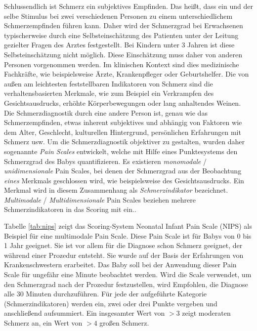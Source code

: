 Schlussendlich ist Schmerz ein subjektives Empfinden. Das heißt, dass ein und der selbe Stimulus bei zwei verschiedenen Personen zu einem unterschiedlichem Schmerzempfinden führen kann. Daher wird der Schmerzgrad bei Erwachsenen typischerweise durch eine Selbsteinschätzung des Patienten unter der Leitung gezielter Fragen des Arztes festgestellt. Bei Kindern unter 3 Jahren ist diese Selbsteinschätzung nicht möglich. Diese Einschätzung muss daher von anderen Personen vorgenommen werden. Im klinischen Kontext sind dies medizinische Fachkräfte, wie beispielsweise Ärzte, Krankenpfleger oder Geburtshelfer. Die von außen am leichtesten feststellbaren Indikatoren von Schmerz sind die verhaltensbasierten Merkmale, wie zum Beispiel ein Verkrampfen des Gesichtsausdrucks, erhöhte Körperbewegungen oder lang anhaltendes Weinen.\cite[S. 438]{PainAssessment01} Die Schmerzdiagnostik durch eine andere Person ist, genau wie das Schmerzempfinden, etwas inherent subjektives und abhängig von Faktoren wie dem Alter, Geschlecht, kulturellen Hintergrund, persönlichen Erfahrungen mit Schmerz usw.\cite[S. 3]{overview} Um die Schmerzdiagnostik objektiver zu gestalten, wurden daher sogenannte \emph{Pain Scales} entwickelt, welche mit Hilfe eines Punktesystems den Schmerzgrad des Babys quantifizieren.\cite[S. 438 - 439]{PainAssessment01} Es existieren \emph{monomodale} / \emph{unidimensionale} Pain Scales, bei denen der Schmerzgrad aus der Beobachtung \emph{eines} Merkmals geschlossen wird, wie beispielsweise des Gesichtsausdrucks. Ein Merkmal wird in diesem Zusammenhang als \emph{Schmerzindikator} bezeichnet. \emph{ Multimodale} / \emph{Multidimensionale} Pain Scales beziehen mehrere Schmerzindikatoren in das Scoring mit ein.\cite[S. 69 - 71]{PainAssessment02}. 

Tabelle \ref{tab:nips} zeigt das Scoring-System \glqq Neonatal Infant Pain Scale\grqq{} (NIPS) als Beispiel für eine multimodale Pain Scale. Diese Pain Scale ist für Babys von 0 bis 1 Jahr geeignet. Sie ist vor allem für die Diagnose schon Schmerz geeignet, der während einer Prozedur entsteht. Sie wurde auf der Basis der Erfahrungen von Krankenschwestern erarbeitet. Das Baby soll bei der Anwendung dieser Pain Scale für ungefähr eine Minute beobachtet werden. Wird die Scale verwendet, um den Schmerzgrad nach der Prozedur festzustellen, wird Empfohlen, die Diagnose alle 30 Minuten durchzuführen. Für jede der aufgeführte Kategorie (Schmerzindikatoren) werden ein, zwei oder drei Punkte vergeben und anschließend aufsummiert. Ein insgesamter Wert von $>3$ zeigt moderaten Schmerz an, ein Wert von $>4$ großen Schmerz.\cite{nips} \cite[S. 98]{painInNeonates}

